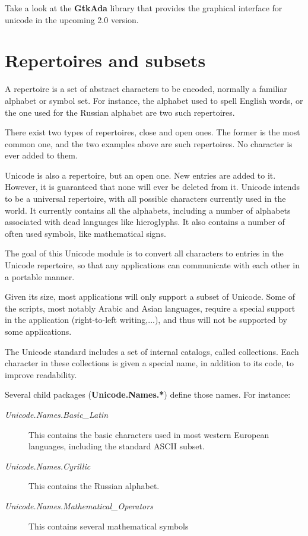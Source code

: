 \documentclass[letterpaper,10pt,english]{sphinxmanual}
\begin{document}
Take a look at the \textbf{GtkAda} library that provides the graphical interface for
unicode in the upcoming 2.0 version.


\section{Repertoires and subsets}
\label{unicode:repertoires-and-subsets}
A repertoire is a set of abstract characters to be encoded, normally a familiar
alphabet or symbol set. For instance, the alphabet used to spell English words,
or the one used for the Russian alphabet are two such repertoires.

There exist two types of repertoires, close and open ones. The former is the
most common one, and the two examples above are such repertoires.  No character
is ever added to them.

Unicode is also a repertoire, but an open one. New entries are added to it.
However, it is guaranteed that none will ever be deleted from it.  Unicode
intends to be a universal repertoire, with all possible characters currently
used in the world. It currently contains all the alphabets, including a number
of alphabets associated with dead languages like hieroglyphs. It also contains
a number of often used symbols, like mathematical signs.

The goal of this Unicode module is to convert all characters to entries in the
Unicode repertoire, so that any applications can communicate with each other in
a portable manner.

Given its size, most applications will only support a subset of Unicode.  Some
of the scripts, most notably Arabic and Asian languages, require a special
support in the application (right-to-left writing,...), and thus will not be
supported by some applications.

The Unicode standard includes a set of internal catalogs, called collections.
Each character in these collections is given a special name, in addition to its
code, to improve readability.

Several child packages (\textbf{Unicode.Names.*}) define those names. For instance:
\begin{description}
\item[{\emph{Unicode.Names.Basic\_Latin}}] \leavevmode
This contains the basic characters used in most western European languages,
including the standard ASCII subset.

\item[{\emph{Unicode.Names.Cyrillic}}] \leavevmode
This contains the Russian alphabet.

\item[{\emph{Unicode.Names.Mathematical\_Operators}}] \leavevmode
This contains several mathematical symbols

\end{description}
\end{document}

